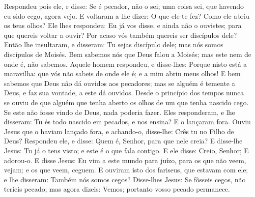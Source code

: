 {  Respondeu pois ele, e disse: Se é pecador, não o sei; uma coisa sei, que havendo eu sido cego, agora vejo.
  E voltaram a lhe dizer: O que ele te fez? Como ele abriu os teus olhos?
  Ele lhes respondeu: Eu já vos disse, e ainda não o ouvistes; para que quereis voltar a ouvir? Por acaso vós também quereis ser discípulos dele?
  Então lhe insultaram, e disseram: Tu sejas discípulo dele; mas nós somos discípulos de Moisés.
  Bem sabemos nós que Deus falou a Moisés; mas este nem de onde é, não sabemos.
  Aquele homem respondeu, e disse-lhes: Porque nisto está a maravilha: que vós não sabeis de onde ele é; e a mim abriu meus olhos!
  E bem sabemos que Deus não dá ouvidos aos pecadores; mas se alguém é temente a Deus, e faz sua vontade, a este dá ouvidos.
  Desde o princípio dos tempos nunca se ouviu de que alguém que tenha aberto os olhos de um que tenha nascido cego.
  Se este não fosse vindo de Deus, nada poderia fazer.
  Eles responderam, e lhe disseram: Tu és todo nascido em pecados, e nos ensina? E o lançaram fora.
  Ouviu Jesus que o haviam lançado fora, e achando-o, disse-lhe: Crês tu no Filho de Deus?
  Respondeu ele, e disse: Quem é, Senhor, para que nele creia?
  E disse-lhe Jesus: Tu já o tens visto; e este é o que fala contigo.
  E ele disse: Creio, Senhor; E adorou-o.
  E disse Jesus: Eu vim a este mundo para juízo, para os que não veem, vejam; e os que veem, ceguem.
  E ouviram isto
{} dos fariseus, que estavam com ele; e lhe disseram: Também nós somos cegos?
  Disse-lhes Jesus: Se fôsseis cegos, não teríeis pecado; mas agora dizeis: Vemos; portanto vosso pecado permanece.
\par }

